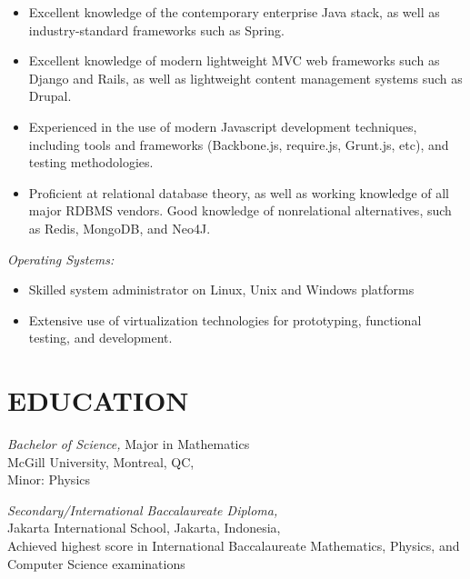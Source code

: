 \documentclass[line,margin]{res}
\begin{document}
\begin{resume}
\begin{itemize}
		\item Excellent knowledge of the contemporary enterprise Java stack, as well as industry-standard frameworks such as Spring.
		\item Excellent knowledge of modern lightweight MVC web frameworks such as Django and Rails, as well as lightweight content management systems such as Drupal.
        \item Experienced in the use of modern Javascript development techniques, including tools and frameworks (Backbone.js, require.js, Grunt.js, etc), and testing methodologies.
		\item Proficient at relational database theory, as well as working knowledge of all major RDBMS vendors. Good knowledge of nonrelational alternatives, such as Redis, MongoDB, and Neo4J.
	\end{itemize}
      {\sl Operating Systems:}
    \vspace{-5mm}
	\begin{itemize}
		\item Skilled system administrator on Linux, Unix and Windows platforms        
		\item Extensive use of virtualization technologies for prototyping, functional testing, and development.        
	\end{itemize}
                 
\section{EDUCATION} {\sl Bachelor of Science,} Major in Mathematics \\
                McGill University, Montreal, QC,  \\
                Minor: Physics 
 
			{\sl Secondary/International Baccalaureate Diploma,} \\
                Jakarta International School,
                Jakarta, Indonesia,  \\
                Achieved highest score in International Baccalaureate Mathematics, Physics, and Computer Science examinations
                
\end{resume}
\end{document}
